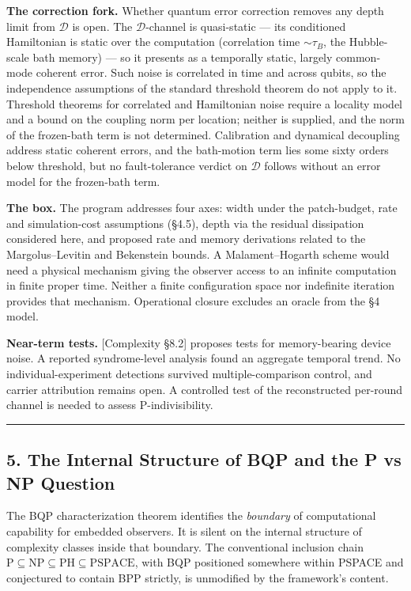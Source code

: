 \documentclass[
]{article}
\begin{document}
\textbf{The correction fork.} Whether quantum error correction removes
any depth limit from \(\mathcal{D}\) is open. The
\(\mathcal{D}\)-channel is quasi-static --- its conditioned Hamiltonian
is static over the computation (correlation time \(\sim\tau_B\), the
Hubble-scale bath memory) --- so it presents as a temporally static,
largely common-mode coherent error. Such noise is correlated in time and
across qubits, so the independence assumptions of the standard threshold
theorem do not apply to it. Threshold theorems for correlated and
Hamiltonian noise require a locality model and a bound on the coupling
norm per location; neither is supplied, and the norm of the frozen-bath
term is not determined. Calibration and dynamical decoupling address
static coherent errors, and the bath-motion term lies some sixty orders
below threshold, but no fault-tolerance verdict on \(\mathcal{D}\)
follows without an error model for the frozen-bath term.

\textbf{The box.} The program addresses four axes: width under the
patch-budget, rate and simulation-cost assumptions (§4.5), depth via the
residual dissipation considered here, and proposed rate and memory
derivations related to the Margolus--Levitin and Bekenstein bounds. A
Malament--Hogarth scheme would need a physical mechanism giving the
observer access to an infinite computation in finite proper time.
Neither a finite configuration space nor indefinite iteration provides
that mechanism. Operational closure excludes an oracle from the §4
model.

\textbf{Near-term tests.} {[}Complexity §8.2{]} proposes tests for
memory-bearing device noise. A reported syndrome-level analysis found an
aggregate temporal trend. No individual-experiment detections survived
multiple-comparison control, and carrier attribution remains open. A
controlled test of the reconstructed per-round channel is needed to
assess P-indivisibility.

\begin{center}\rule{0.5\linewidth}{0.5pt}\end{center}

\hypertarget{the-internal-structure-of-bqp-and-the-p-vs-np-question}{%
\subsection{5. The Internal Structure of BQP and the P vs NP
Question}\label{the-internal-structure-of-bqp-and-the-p-vs-np-question}}

The BQP characterization theorem identifies the \emph{boundary} of
computational capability for embedded observers. It is silent on the
internal structure of complexity classes inside that boundary. The
conventional inclusion chain
\(\mathrm{P} \subseteq \mathrm{NP} \subseteq \mathrm{PH} \subseteq \mathrm{PSPACE}\),
with BQP positioned somewhere within PSPACE and conjectured to contain
BPP strictly, is unmodified by the framework's content.
\end{document}
